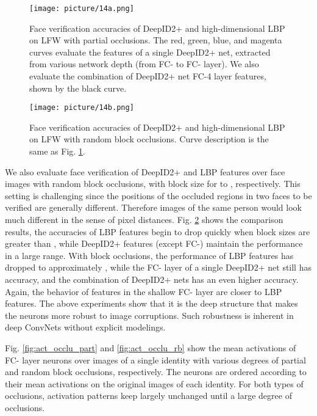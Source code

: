 \documentclass[10pt,twocolumn,letterpaper]{article}
\begin{document}
\begin{figure}[t]
\begin{center}
\texttt{[image: picture/14a.png]}
\end{center}
\vspace{-0.15in}
\caption{Face verification accuracies of DeepID2+ and high-dimensional LBP on LFW with partial occlusions. The red, green, blue, and magenta curves evaluate the features of a single DeepID2+ net, extracted from various network depth (from FC- to FC- layer). We also evaluate the combination of  DeepID2+ net FC-4 layer features, shown by the black curve.}
\label{fig:accu_occlu}
\vspace{-0.15in}
\end{figure}

\begin{figure}[t]
\begin{center}
\texttt{[image: picture/14b.png]}
\end{center}
\vspace{-0.15in}
\caption{Face verification accuracies of DeepID2+ and high-dimensional LBP on LFW with random block occlusions. Curve description is the same as Fig. \ref{fig:accu_occlu}.}
\label{fig:accu_rb}
\vspace{-0.15in}
\end{figure}

We also evaluate face verification of DeepID2+ and LBP features over face images with random block occlusions, with  block size for  to , respectively. This setting is challenging since the positions of the occluded regions in two faces to be verified are generally different. Therefore images of the same person would look much different in the sense of pixel distances. Fig. \ref{fig:accu_rb} shows the comparison results, the accuracies of LBP features begin to drop quickly when block sizes are greater than , while DeepID2+ features (except FC-) maintain the performance in a large range. With  block occlusions, the performance of LBP features has dropped to approximately , while the FC- layer of a single DeepID2+ net still has  accuracy, and the combination of  DeepID2+ nets has an even higher  accuracy. Again, the behavior of features in the shallow FC- layer are closer to LBP features. The above experiments show that it is the deep structure that makes the neurons more robust to image corruptions. Such robustness is inherent in deep ConvNets without explicit modelings.

Fig. \ref{fig:act_occlu_part} and \ref{fig:act_occlu_rb} show the mean activations of FC- layer neurons over images of a single identity with various degrees of partial and random block occlusions, respectively. The neurons are ordered according to their mean activations on the original images of each identity. For both types of occlusions, activation patterns keep largely unchanged until a large degree of occlusions.
\end{document}
